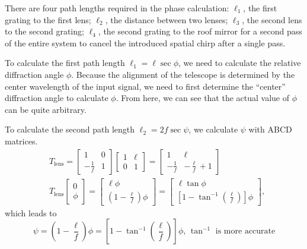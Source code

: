 \documentclass[12pt,hidelinks]{book}
\begin{document}
There are four path lengths required in the phase calculation: $\ell_1$, the first grating to the first lens; $\ell_2$, the distance between two lenses; $\ell_3$, the second lens to the second grating; $\ell_4$, the second grating to the roof mirror for a second pass of the entire system to cancel the introduced spatial chirp after a single pass.

To calculate the first path length $\ell_1=\ell\sec\phi$, we need to calculate the relative diffraction angle $\phi$. Because the alignment of the telescope is determined by the center wavelength of the input signal, we need to first determine the ``center'' diffraction angle to calculate $\phi$. From here, we can see that the actual value of $\phi$ can be quite arbitrary. 

To calculate the second path length $\ell_2=2f\sec\psi$, we calculate $\psi$ with ABCD matrices.
\begin{subequations}
\begin{align}
& T_{\text{lens}}=\begin{bmatrix}
1 & 0 \\
-\frac{1}{f} & 1
\end{bmatrix}
\begin{bmatrix}
1 & \ell \\
0 & 1
\end{bmatrix}=
\begin{bmatrix}
1 & \ell \\
-\frac{1}{f} & -\frac{\ell}{f}+1
\end{bmatrix} \\
& T_{\text{lens}}
\begin{bmatrix}
0 \\ \phi
\end{bmatrix}=
\begin{bmatrix}
\ell\phi \\ \left(1-\frac{\ell}{f}\right)\phi
\end{bmatrix}=
\begin{bmatrix}
\ell\tan\phi \\ \left[1-\tan^{-1}\left(\frac{\ell}{f}\right)\right]\phi
\end{bmatrix},
\end{align}
\end{subequations}
which leads to
\begin{equation}
\psi=\left(1-\frac{\ell}{f}\right)\phi=\left[1-\tan^{-1}\left(\frac{\ell}{f}\right)\right]\phi\text{, }\tan^{-1}\text{ is more accurate}
\end{equation}
\end{document}
